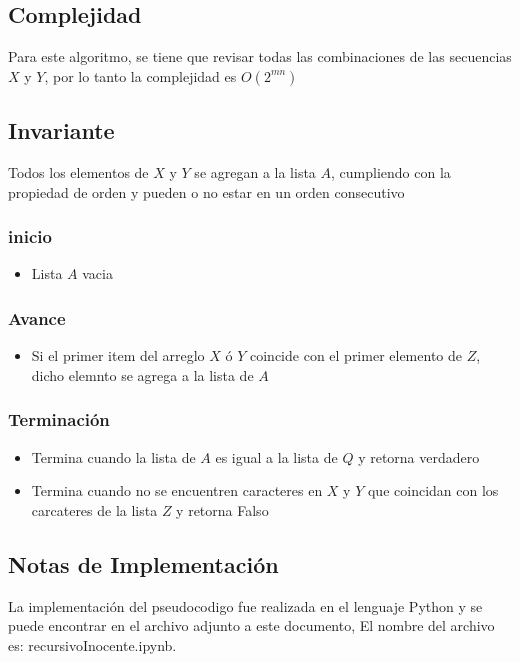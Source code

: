 \documentclass[]{article}
\numberwithin{equation}{section}
\numberwithin{figure}{section}
\theoremstyle{definition}
\begin{document}
	
	\subsection*{Complejidad}
	
	\text Para este algoritmo, se tiene que revisar todas las combinaciones de las secuencias $X$ y $Y$, por lo tanto la complejidad es $O(2^{mn})$
	
	\subsection*{Invariante}
	
	\text Todos los elementos de $X$ y $Y$ se agregan a la lista $A$, cumpliendo con la propiedad de orden y pueden o no estar en un orden consecutivo
	
	\subsubsection*{inicio}
	\begin{itemize}
	\item Lista $A$ vacia
	\end{itemize}
	\subsubsection*{Avance}
	\begin{itemize}
	\item Si el primer item del arreglo $X$ ó $Y$ coincide con el primer elemento de $Z$, dicho elemnto se agrega a la lista de $A$
	\end{itemize}
	\subsubsection*{Terminación}
	\begin{itemize}
	\item Termina cuando la lista de $A$ es igual a la lista de $Q$ y retorna verdadero
	\item Termina cuando no se encuentren caracteres en $X$ y $Y$ que coincidan con los carcateres de la lista $Z$ y retorna Falso
	\end{itemize}
	
	\subsection*{Notas de Implementación}
	
	\text La implementación del pseudocodigo fue realizada en el lenguaje Python y se puede encontrar en el archivo adjunto a este documento, El nombre del archivo es: recursivoInocente.ipynb.
\end{document}
